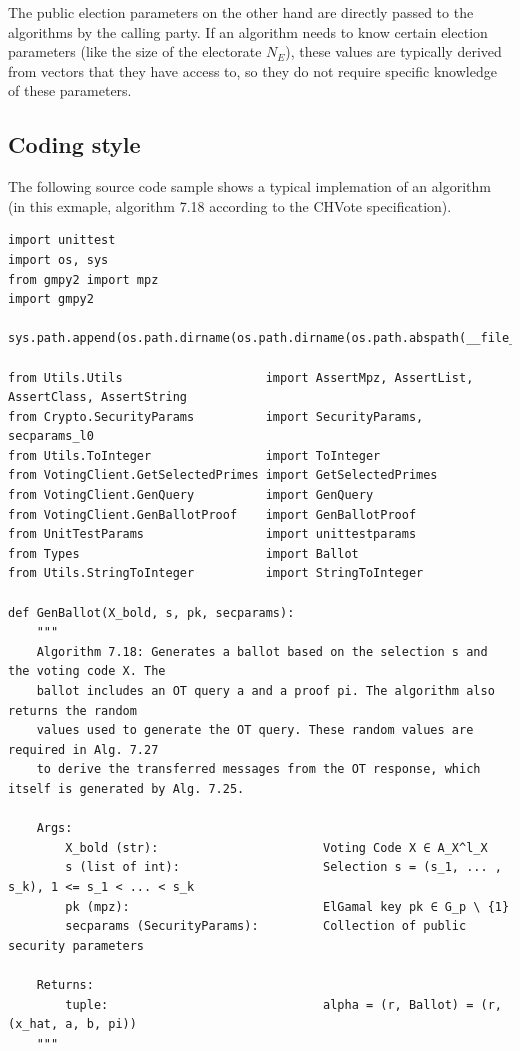 The public election parameters on the other hand are directly passed to the algorithms by the calling party. If an algorithm needs to know certain election parameters (like the size of the electorate $N_E$), these values are typically derived from vectors that they have access to, so they do not require specific knowledge of these parameters.

\subsection{Coding style}
The following source code sample shows a typical implemation of an algorithm (in this exmaple, algorithm 7.18 according to the CHVote specification).

\begin{verbatim}
import unittest
import os, sys
from gmpy2 import mpz
import gmpy2

sys.path.append(os.path.dirname(os.path.dirname(os.path.abspath(__file__))))

from Utils.Utils                    import AssertMpz, AssertList, AssertClass, AssertString
from Crypto.SecurityParams          import SecurityParams, secparams_l0
from Utils.ToInteger                import ToInteger
from VotingClient.GetSelectedPrimes import GetSelectedPrimes
from VotingClient.GenQuery          import GenQuery
from VotingClient.GenBallotProof    import GenBallotProof
from UnitTestParams                 import unittestparams
from Types                          import Ballot
from Utils.StringToInteger          import StringToInteger

def GenBallot(X_bold, s, pk, secparams):
    """
    Algorithm 7.18: Generates a ballot based on the selection s and the voting code X. The
    ballot includes an OT query a and a proof pi. The algorithm also returns the random
    values used to generate the OT query. These random values are required in Alg. 7.27
    to derive the transferred messages from the OT response, which itself is generated by Alg. 7.25.

    Args:
        X_bold (str):                       Voting Code X ∈ A_X^l_X
        s (list of int):                    Selection s = (s_1, ... , s_k), 1 <= s_1 < ... < s_k
        pk (mpz):                           ElGamal key pk ∈ G_p \ {1}
        secparams (SecurityParams):         Collection of public security parameters

    Returns:
        tuple:                              alpha = (r, Ballot) = (r, (x_hat, a, b, pi))
    """


\end{verbatim}
